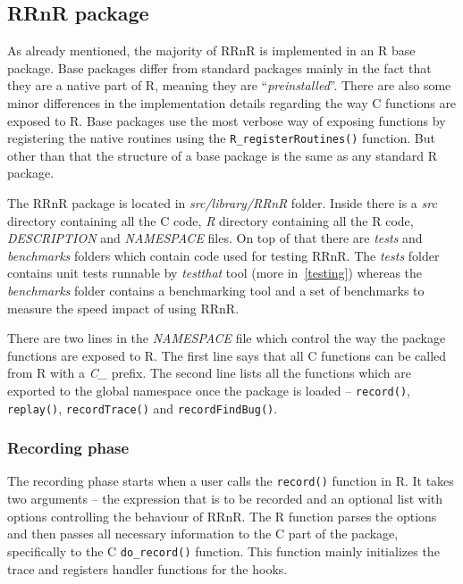 \documentclass[thesis=M,english,hidelinks]{FITthesis}[2012/10/20]
\newcommand*{\qt}[1]{\enquote{{\itshape#1}}}
\begin{document}
		\subsection{RRnR package}
		As already mentioned, the majority of RRnR is implemented in an R base package. Base packages differ from standard packages mainly in the fact that they are a native part of R, meaning they are \qt{preinstalled}. There are also some minor differences in the implementation details regarding the way C functions are exposed to R. Base packages use the most verbose way of exposing functions by registering the native routines using the \lstinline|R_registerRoutines()| function. But other than that the structure of a base package is the same as any standard R package.\par
		
		The RRnR package is located in \emph{src/library/RRnR} folder. Inside there is a \emph{src} directory containing all the C code, \emph{R} directory containing all the R code, \emph{DESCRIPTION} and \emph{NAMESPACE} files. On top of that there are \emph{tests} and \emph{benchmarks} folders which contain code used for testing RRnR. The \emph{tests} folder contains unit tests runnable by \emph{testthat} tool (more in~\ref{testing}) whereas the \emph{benchmarks} folder contains a benchmarking tool and a set of benchmarks to measure the speed impact of using RRnR.\par
		
		There are two lines in the \emph{NAMESPACE} file which control the way the package functions are exposed to R. The first line says that all C functions can be called from R with a \emph{C\_} prefix. The second line lists all the functions which are exported to the global namespace once the package is loaded -- \lstinline|record()|, \lstinline|replay()|, \lstinline|recordTrace()| and \lstinline|recordFindBug()|.
		
			\subsubsection{Recording phase}
			The recording phase starts when a user calls the \lstinline|record()| function in R. It takes two arguments -- the expression that is to be recorded and an optional list with options controlling the behaviour of RRnR. The R function parses the options and then passes all necessary information to the C part of the package, specifically to the C \lstinline|do_record()| function. This function mainly initializes the trace and registers handler functions for the hooks.\par
			
\end{document}
